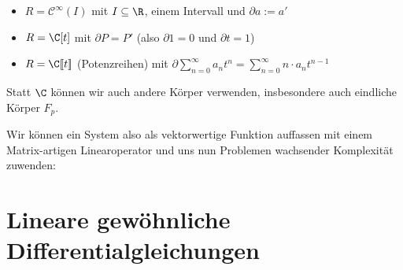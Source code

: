\documentclass[main.tex]{subfiles}
\begin{document}
\begin{Beispiel}
  \begin{itemize}
    \item $R = \mathcal{C}^\infty(I)$ mit $I \subseteq \R$, einem Intervall und $\partial a := a'$
    \item $R = \C[t]$ mit $\partial P = P'$ (also $\partial1 = 0$ und $\partial t = 1$)
    \item $R = \C[\![t]\!]$ (Potenzreihen) mit $\partial \sum \limits_{n=0}^\infty a_n t^n = \sum \limits_{n=0}^\infty n \cdot a_nt^{n-1}$
  \end{itemize}
  Statt $\C$ können wir auch andere Körper verwenden, insbesondere auch eindliche Körper $F_p$.
\end{Beispiel}

Wir können ein System also als vektorwertige Funktion auffassen mit einem Matrix-artigen Linearoperator und uns nun Problemen wachsender Komplexität zuwenden:


\section{Lineare gewöhnliche Differentialgleichungen}
\end{document}
